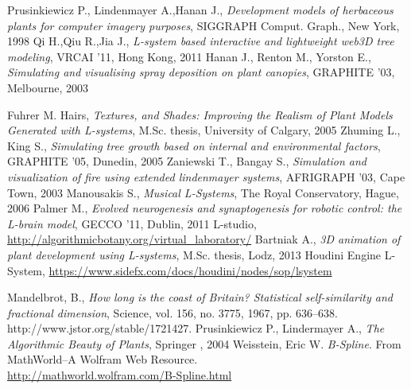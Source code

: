 \documentclass[b5paper,twoside,11pt]{article}
\begin{document}
\begin{thebibliography}{99}
\small
{}Prusinkiewicz P., Lindenmayer A.,Hanan J., \textit{Development models of herbaceous plants for computer imagery purposes}, SIGGRAPH Comput. Graph., New York, 1998
Qi H.,Qiu R.,Jia J., \textit{L-system based interactive and lightweight web3D tree modeling}, VRCAI '11, Hong Kong, 2011
Hanan J., Renton M., Yorston E., \textit{Simulating and visualising spray deposition on plant canopies}, GRAPHITE '03, Melbourne, 2003

Fuhrer M. Hairs, \textit{Textures, and Shades: Improving the Realism of Plant Models Generated with L-systems}, M.Sc. thesis, University of Calgary, 2005
Zhuming L., King S., \textit{Simulating tree growth based on internal and environmental factors}, GRAPHITE '05, Dunedin, 2005
 Zaniewski T., Bangay S., \textit{Simulation and visualization of fire using extended lindenmayer systems}, AFRIGRAPH '03, Cape Town, 2003
Manousakis S., \textit{Musical L-Systems}, The Royal Conservatory, Hague, 2006
Palmer M., \textit{Evolved neurogenesis and synaptogenesis for robotic control: the L-brain model}, GECCO '11, Dublin, 2011
L-studio, \url{http://algorithmicbotany.org/virtual_laboratory/}
Bartniak A., \textit{3D animation of plant development using L-systems}, M.Sc. thesis, Lodz, 2013
Houdini Engine L-System, \url{https://www.sidefx.com/docs/houdini/nodes/sop/lsystem}

Mandelbrot, B., \textit{How long is the coast of Britain? Statistical self-similarity and fractional dimension}, Science, vol. 156, no. 3775, 1967, pp. 636–638. http://www.jstor.org/stable/1721427.
Prusinkiewicz P., Lindermayer A., \textit{The Algorithmic Beauty of Plants}, Springer , 2004
  Weisstein, Eric W. \textit{B-Spline}. From MathWorld--A Wolfram Web Resource.\\ \url{http://mathworld.wolfram.com/B-Spline.html }


\end{thebibliography}

\ifdefined\PROCINCLUDED
%
\else
\end{document}
